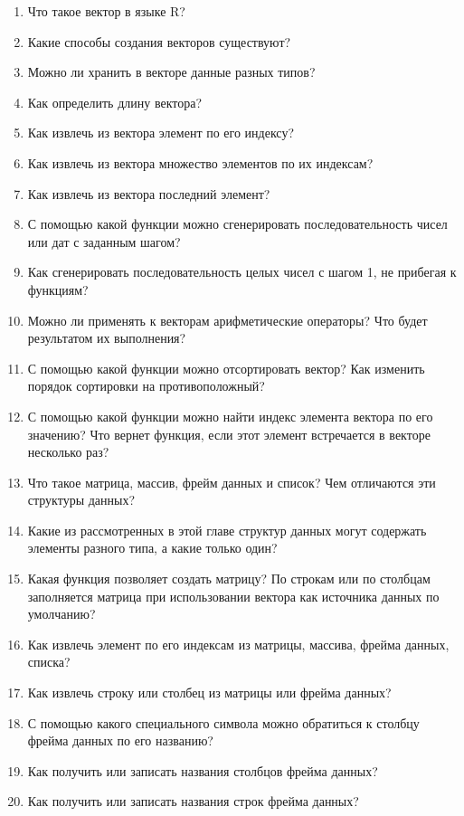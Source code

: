 \documentclass[]{book}
\providecommand{\tightlist}{%
  \setlength{\itemsep}{0pt}\setlength{\parskip}{0pt}}
\begin{document}
\begin{enumerate}
\def\labelenumi{\arabic{enumi}.}
\tightlist
\item
  Что такое вектор в языке R?
\item
  Какие способы создания векторов существуют?
\item
  Можно ли хранить в векторе данные разных типов?
\item
  Как определить длину вектора?
\item
  Как извлечь из вектора элемент по его индексу?
\item
  Как извлечь из вектора множество элементов по их индексам?
\item
  Как извлечь из вектора последний элемент?
\item
  С помощью какой функции можно сгенерировать последовательность чисел
  или дат с заданным шагом?
\item
  Как сгенерировать последовательность целых чисел с шагом 1, не
  прибегая к функциям?
\item
  Можно ли применять к векторам арифметические операторы? Что будет
  результатом их выполнения?
\item
  С помощью какой функции можно отсортировать вектор? Как изменить
  порядок сортировки на противоположный?
\item
  С помощью какой функции можно найти индекс элемента вектора по его
  значению? Что вернет функция, если этот элемент встречается в векторе
  несколько раз?
\item
  Что такое матрица, массив, фрейм данных и список? Чем отличаются эти
  структуры данных?
\item
  Какие из рассмотренных в этой главе структур данных могут содержать
  элементы разного типа, а какие только один?
\item
  Какая функция позволяет создать матрицу? По строкам или по столбцам
  заполняется матрица при использовании вектора как источника данных по
  умолчанию?
\item
  Как извлечь элемент по его индексам из матрицы, массива, фрейма
  данных, списка?
\item
  Как извлечь строку или столбец из матрицы или фрейма данных?
\item
  С помощью какого специального символа можно обратиться к столбцу
  фрейма данных по его названию?
\item
  Как получить или записать названия столбцов фрейма данных?
\item
  Как получить или записать названия строк фрейма данных?

\end{enumerate}
\end{document}
